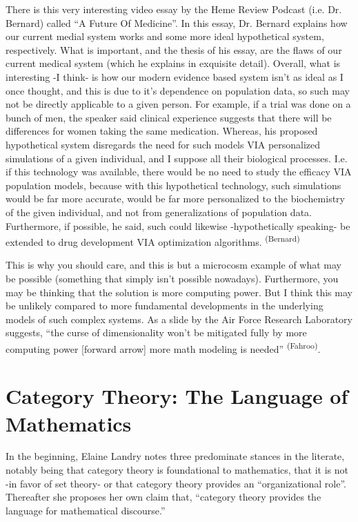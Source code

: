 There is this very interesting video essay by the Heme Review Podcast (i.e.  Dr. Bernard) called ``A Future Of Medicine''. In this essay, Dr. Bernard explains how our current medial system works and some more ideal hypothetical system, respectively. What is important, and the thesis of his essay, are the flaws of our current medical system (which he explains in exquisite detail). Overall, what is interesting -I think- is how our modern evidence based system isn’t as ideal as I once thought, and this is due to it’s dependence on population data, so such may not be directly applicable to a given person. For example, if a trial was done on a bunch of men, the speaker said clinical experience suggests that there will be differences for women taking the same medication. Whereas, his proposed hypothetical system disregards the need for such models VIA personalized simulations of a given individual, and I suppose all their biological processes. I.e. if this technology was available, there would be no need to study the efficacy VIA population models, because with this hypothetical technology, such simulations would be far more accurate, would be far more personalized to the biochemistry of the given individual, and not from generalizations of population data. Furthermore, if possible, he said, such could likewise -hypothetically speaking- be extended to drug development VIA optimization algorithms. \textsuperscript{(Bernard)}

This is why you should care, and this is but a microcosm example of what may be possible (something that simply isn't possible nowadays). Furthermore, you may be thinking that the solution is more computing power. But I think this may be unlikely compared to more fundamental developments in the underlying models of such complex systems. As a slide by the Air Force Research Laboratory suggests, ``the curse of dimensionality won’t be mitigated fully by more computing power [forward arrow] more math modeling is needed'' \textsuperscript{(Fahroo)}.


\section*{Category Theory: The Language of Mathematics}

In the beginning, Elaine Landry notes three predominate stances in the literate, notably being that category theory is foundational to mathematics, that it is not -in favor of set theory- or that category theory provides an ``organizational role''.  Thereafter she proposes her own claim that, ``category theory provides the language for mathematical discourse.''

